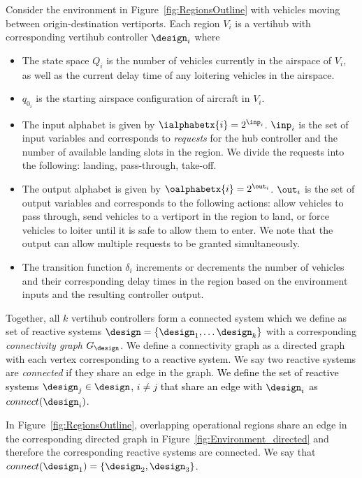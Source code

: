 \begin{eg}
Consider the environment in Figure~\ref{fig:RegionsOutline} with vehicles moving between origin-destination vertiports. Each region $V_i$ is a vertihub with corresponding vertihub controller $\design_i$ where 
\begin{itemize}
    \item The state space $Q_i$ is the number of vehicles currently in the airspace of $V_i$, as well as the current delay time of any loitering vehicles in the airspace.
    \item $q_{0_i}$ is the starting airspace configuration of aircraft in $V_i$.
    \item The input alphabet is given by $\ialphabetx{i} = 2^{\inp_i}$. $\inp_i$ is the set of input variables and corresponds to \emph{requests} for the hub controller and the number of available landing slots in the region. We divide the requests into the following: landing, pass-through, take-off. 
    \item The output alphabet is given by $\oalphabetx{i} = 2^{\out_i}$. $\out_i$ is the set of output variables and corresponds to the following actions: allow vehicles to pass through, send vehicles to a vertiport in the region to land, or force vehicles to loiter until it is safe to allow them to enter. We note that the output can allow multiple requests to be granted simultaneously. 
    \item The transition function $\delta_i$ increments or decrements the number of vehicles and their corresponding delay times in the region based on the environment inputs and the resulting controller output. 
\end{itemize}
\end{eg}




Together, all $k$ vertihub controllers form a connected system which we define as set of reactive systems $\design = \{\design_1, \dots \design_k\}$ with a corresponding \emph{connectivity graph} $G_{\design}$.
We define a connectivity graph as a directed graph with each vertex corresponding to a reactive system.
We say two reactive systems are \emph{connected} if they share an edge in the graph. \textcolor{black}{ We define the set of reactive systems $\design_j \in \design$, $i \neq j$ that share an edge with $\design_i$ as $connect(\design_i)$.}
\begin{eg}
In Figure~\ref{fig:RegionsOutline}, overlapping operational regions share an edge in the corresponding directed graph in Figure~\ref{fig:Environment_directed} and therefore the corresponding reactive systems are connected. We say that $connect(\design_1) = \{\design_2,\design_3 \}$.
\end{eg}


